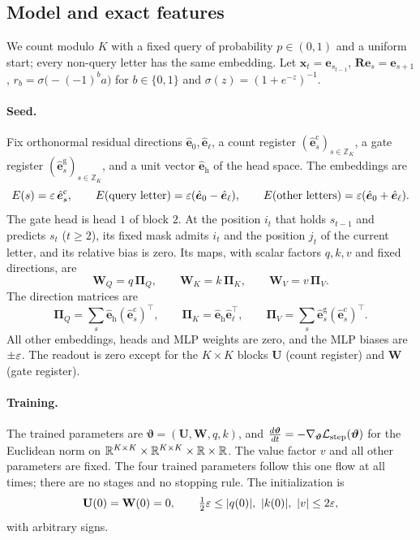 \subsection{Model and exact features}

We count modulo $K$ with a fixed query of probability $p\in(0,1)$ and a uniform start; every non-query letter has the same embedding. Let $\bm x_t=\bm e_{s_{t-1}}$, $\mathbf R\bm e_s=\bm e_{s+1}$, $r_b=\sigma\bigl(-(-1)^ba\bigr)$ for $b\in\{0,1\}$ and $\sigma(z)=(1+e^{-z})^{-1}$.

\paragraph{Seed.} Fix orthonormal residual directions $\hat{\bm e}_0,\hat{\bm e}_\ell$, a count register $(\hat{\bm e}^{\mathrm c}_s)_{s\in\mathbb Z_K}$, a gate register
$(\hat{\bm e}^{\mathrm g}_s)_{s\in\mathbb Z_K}$, and a unit vector $\hat{\bm e}_{\mathrm h}$ of the head space. The embeddings are
\[
 E(s)=\varepsilon\,\hat{\bm e}^{\mathrm c}_s,\qquad E(\text{query letter})=\varepsilon(\hat{\bm e}_0-\hat{\bm e}_\ell),\qquad E(\text{other letters})=\varepsilon(\hat{\bm e}_0+\hat{\bm e}_\ell).
\]
The gate head is head $1$ of block $2$. At the position $i_t$ that holds $s_{t-1}$ and predicts $s_t$ ($t\ge2$), its fixed mask admits
$i_t$ and the position $j_t$ of the current letter, and its relative bias is zero. Its maps, with scalar factors $q,k,v$ and fixed directions, are
\[\mathbf W_Q=q\,\bm\Pi_Q,\qquad \mathbf W_K=k\,\bm\Pi_K,\qquad \mathbf W_V=v\,\bm\Pi_V.\]
The direction matrices are
\[
 \bm\Pi_Q=\textstyle\sum_s\hat{\bm e}_{\mathrm h}(\hat{\bm e}^{\mathrm c}_s)^{\!\top},\qquad \bm\Pi_K=\hat{\bm e}_{\mathrm h}\hat{\bm e}_\ell^{\top},\qquad \bm\Pi_V=\sum_s\hat{\bm e}^{\mathrm g}_s(\hat{\bm e}^{\mathrm c}_s)^{\!\top}.
\]
All other embeddings, heads and MLP weights are zero, and the MLP biases are $\pm\varepsilon$. The readout is zero except for the
$K\times K$ blocks $\mathbf U$ (count register) and $\mathbf W$ (gate register).

\paragraph{Training.} The trained parameters are $\bm\vartheta=(\mathbf U,\mathbf W,q,k)$, and $\ddt{\bm\vartheta}=-\nabla_{\bm\vartheta}\Lstep(\bm\vartheta)$ for the Euclidean norm on
$\mathbb R^{K\times K}\times\mathbb R^{K\times K}\times\mathbb R\times\mathbb R$. The value factor $v$ and all other parameters are fixed. The four trained parameters follow
this one flow at all times; there are no stages and no stopping rule. The initialization is
\[
 \mathbf U(0)=\mathbf W(0)=0,\qquad \tfrac{1}{2}\initscale\le|q(0)|,\ |k(0)|,\ |v|\le2\initscale,
\]
with arbitrary signs.

